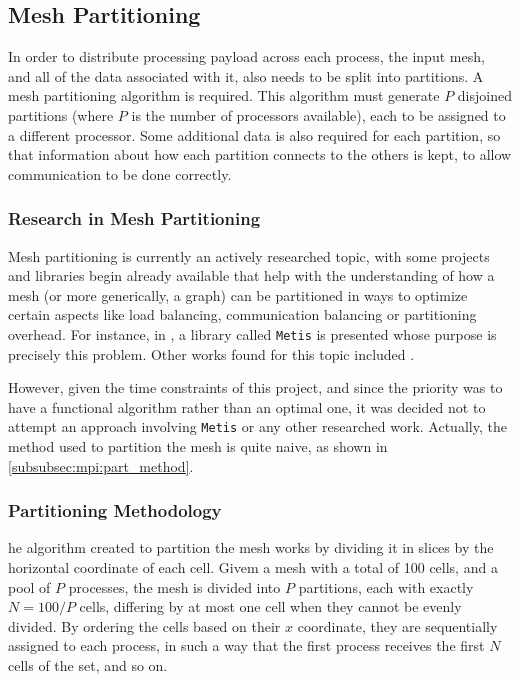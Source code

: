 \subsection{Mesh Partitioning}
\label{subsec:mpi:partitioning}

In order to distribute processing payload across each process, the input mesh, and all of the data associated with it, also needs to be split into partitions. A mesh partitioning algorithm is required. This algorithm must generate $P$ disjoined partitions (where $P$ is the number of processors available), each to be assigned to a different processor. Some additional data is also required for each partition, so that information about how each partition connects to the others is kept, to allow communication to be done correctly.

\subsubsection{Research in Mesh Partitioning}
\label{subsubsec:mpi:partitioning:research}

Mesh partitioning is currently an actively researched topic, with some projects and libraries begin already available that help with the understanding of how a mesh (or more generically, a graph) can be partitioned in ways to optimize certain aspects like load balancing, communication balancing or partitioning overhead. For instance, in \cite{metis}, a library called \texttt{Metis} is presented whose purpose is precisely this problem. Other works found for this topic included \cite{gilbert1995, walshaw2000}.

However, given the time constraints of this project, and since the priority was to have a functional algorithm rather than an optimal one, it was decided not to attempt an approach involving \texttt{Metis} or any other researched work. Actually, the method used to partition the mesh is quite naive, as shown in \cref{subsubsec:mpi:part_method}.

\subsubsection{Partitioning Methodology}
\label{subsubsec:mpi:partitioning:method}

he algorithm created to partition the mesh works by dividing it in slices by the horizontal coordinate of each cell. Givem a mesh with a total of 100 cells, and a pool of $P$ processes, the mesh is divided into $P$ partitions, each with exactly $N=100/P$ cells, differing by at most one cell when they cannot be evenly divided. By ordering the cells based on their $x$ coordinate, they are sequentially assigned to each process, in such a way that the first process receives the first $N$ cells of the set, and so on.

